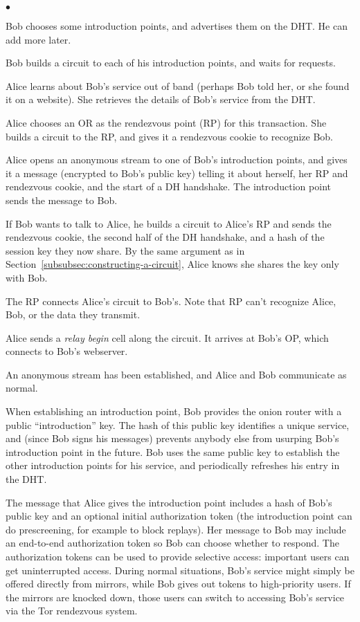 \documentclass[times,10pt,twocolumn]{article}
\newenvironment{tightlist}{\begin{list}{$\bullet$}{
  \setlength{\itemsep}{0mm}
    \setlength{\parsep}{0mm}
    }}{\end{list}}
\begin{document}
\begin{tightlist}
\item Bob chooses some introduction points, and advertises them on
      the DHT.  He can add more later.
\item Bob builds a circuit to each of his introduction points,
      and waits for requests.
\item Alice learns about Bob's service out of band (perhaps Bob told her,
      or she found it on a website). She retrieves the details of Bob's
      service from the DHT.
\item Alice chooses an OR as the rendezvous point (RP) for this
      transaction. She builds a circuit to the RP, and gives it a
      rendezvous cookie to recognize Bob.
\item Alice opens an anonymous stream to one of Bob's introduction
      points, and gives it a message (encrypted to Bob's public key)
      telling it about herself,
      her RP and rendezvous cookie, and the
      start of a DH
      handshake. The introduction point sends the message to Bob.
\item If Bob wants to talk to Alice, he builds a circuit to Alice's
      RP and sends the rendezvous cookie, the second half of the DH
      handshake, and a hash of the session
      key they now share. By the same argument as in
      Section~\ref{subsubsec:constructing-a-circuit}, Alice knows she
      shares the key only with Bob.
\item The RP connects Alice's circuit to Bob's. Note that RP can't
      recognize Alice, Bob, or the data they transmit.
\item Alice sends a \emph{relay begin} cell along the circuit. It
      arrives at Bob's OP, which connects to Bob's
      webserver.
\item An anonymous stream has been established, and Alice and Bob
      communicate as normal.
\end{tightlist}

When establishing an introduction point, Bob provides the onion router
with a public ``introduction'' key. The hash of this public key
identifies a unique service, and (since Bob signs his
messages) prevents anybody else from usurping Bob's introduction point
in the future. Bob uses the same public key to establish the other
introduction points for his service, and periodically refreshes his
entry in the DHT.

The message that Alice gives
the introduction point includes a hash of Bob's public key %
and an optional initial authorization token (the
introduction point can do prescreening, for example to block replays). Her
message to Bob may include an end-to-end authorization token so Bob
can choose whether to respond.
The authorization tokens can be used to provide selective access:
important users can get uninterrupted access.
During normal situations, Bob's service might simply be offered
directly from mirrors, while Bob gives out tokens to high-priority users. If
the mirrors are knocked down,
those users can switch to accessing Bob's service via
the Tor rendezvous system.
\end{document}
